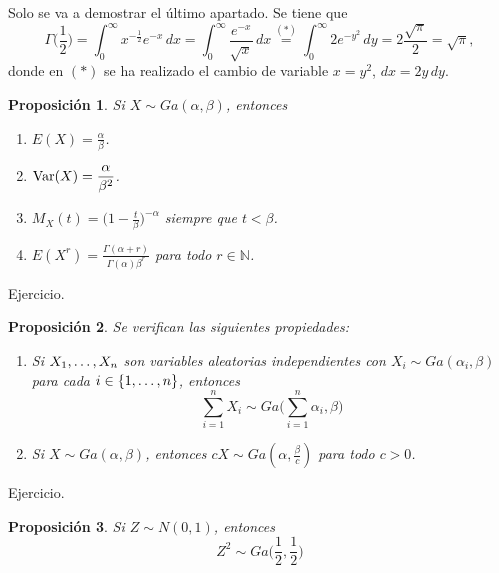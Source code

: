 \documentclass[11pt]{report}
\makeatletter
\renewenvironment{proof}[1][\proofname]{\par
  \pushQED{\qed}%
  \normalfont \topsep\z@skip %
  \trivlist
  \item[\hskip\labelsep
        \itshape
    #1\@addpunct{.}]\ignorespaces
}{%
  \popQED\endtrivlist\@endpefalse
}
\newtheorem{proposition}{Proposición}
\theoremstyle{definition}
\newcommand{\N}{\mathbb N}
\makeatother
\begin{document}
\begin{proof}
Solo se va a demostrar el último apartado. Se tiene que \[\Gamma\bigl(\frac{1}{2}\bigr) = \int_0^\infty x^{-\frac{1}{2}}e^{-x} \, dx = \int_0^\infty \frac{e^{-x}}{\sqrt{x}} \, dx \overset{(\ast)}{=} \int_0^\infty 2e^{-y^2} \, dy = 2\frac{\sqrt{\pi}}{2} = \sqrt{\pi},\]
donde en $(\ast)$ se ha realizado el cambio de variable $x = y^2$, $dx = 2y\, dy$. \qedhere
\end{proof}

\begin{proposition}
\label{prop2.9}
Si $X \sim Ga(\alpha,\beta)$, entonces
\begin{enumerate}
    \item $\displaystyle E(X) = \frac{\alpha}{\beta}$.
    \item $\displaystyle \textup{Var}(X) = \frac{\alpha}{\beta^2}$.
    \item $\displaystyle M_X(t) = \bigl(1-\frac{t}{\beta}\bigr)^{-\alpha}$ siempre que $t < \beta$.
    \item $\displaystyle E(X^r) = \frac{\Gamma(\alpha+r)}{\Gamma(\alpha)\beta^r}$ para todo $r \in \N$.
\end{enumerate}
\end{proposition}

\begin{proof}
    Ejercicio.
\end{proof}

\begin{proposition}
\label{prop2.10}
Se verifican las siguientes propiedades:
\begin{enumerate}
    \item Si $X_1,\mathellipsis,X_n$ son variables aleatorias independientes con $X_i \sim Ga(\alpha_i,\beta)$ para cada $i \in \{1,\mathellipsis,n\}$, entonces
\[\sum_{i=1}^n X_i \sim Ga\bigl(\sum_{i=1}^n \alpha_i,\beta\bigr)\]
\item Si $X \sim Ga(\alpha,\beta)$, entonces $cX \sim Ga(\alpha,\frac{\beta}{c})$ para todo $c >0$.
\end{enumerate}
\end{proposition}

\begin{proof}
    Ejercicio.
\end{proof}

\begin{proposition}
\label{prop2.11}
    Si $Z \sim N(0,1)$, entonces
    \[Z^2 \sim Ga\bigl(\frac{1}{2},\frac{1}{2}\bigr)\]
\end{proposition}
\end{document}
